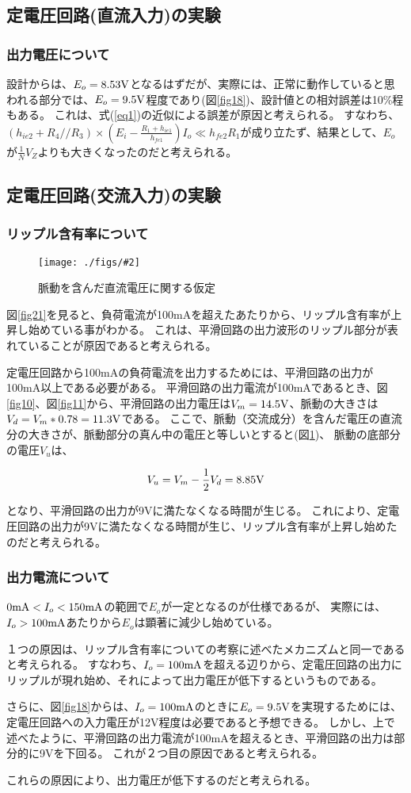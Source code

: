 \documentclass[11pt]{jsarticle}
\newcommand{\fg}[3]{ %
    \begin{figure}
        \begin{center}
            \texttt{[image: ./figs/\#2]}
            \caption{#3}
            \label{#1}
        \end{center}
    \end{figure}
}
\newcommand{\fr}[1]{図\ref{#1}}
\newcommand{\er}[1]{式(\ref{#1})}
\begin{document}
\subsection{定電圧回路(直流入力)の実験}
\subsubsection{出力電圧について}
設計からは、$E_o = 8.53{\rm V}$となるはずだが、実際には、正常に動作していると思われる部分では、$E_o = 9.5{\rm V}$程度であり(\fr{fig18})、設計値との相対誤差は10\%程もある。
これは、\er{eq1}の近似による誤差が原因と考えられる。
すなわち、$\left( h_{ie2} + R_4 // R_3 \right) \times \left( E_i - \frac{R_1 + h_{ie1}}{h_{fe1}} \right) I_o \ll h_{fe2}R_1$が成り立たず、結果として、$E_o$が$\frac{1}{N}V_Z$よりも大きくなったのだと考えられる。

\subsection{定電圧回路(交流入力)の実験}
\subsubsection{リップル含有率について}
\fg{fig27}{wave.png}{脈動を含んだ直流電圧に関する仮定}

\fr{fig21}を見ると、負荷電流が100mAを超えたあたりから、リップル含有率が上昇し始めている事がわかる。
これは、平滑回路の出力波形のリップル部分が表れていることが原因であると考えられる。

定電圧回路から100mAの負荷電流を出力するためには、平滑回路の出力が100mA以上である必要がある。
平滑回路の出力電流が100mAであるとき、\fr{fig10}、\fr{fig11}から、平滑回路の出力電圧は$V_m = 14.5{\rm V}$、脈動の大きさは$V_d = V_m * 0.78 = 11.3 {\rm V}$である。
ここで、脈動（交流成分）を含んだ電圧の直流分の大きさが、脈動部分の真ん中の電圧と等しいとすると(\fr{fig27})、
脈動の底部分の電圧$V_u$は、

\[
    V_u = V_m - \frac{1}{2} V_d = 8.85 {\rm V}
\]

となり、平滑回路の出力が9Vに満たなくなる時間が生じる。
これにより、定電圧回路の出力が9Vに満たなくなる時間が生じ、リップル含有率が上昇し始めたのだと考えられる。

\subsubsection{出力電流について}
$0{\rm mA} < I_o < 150 {\rm mA}$の範囲で$E_o$が一定となるのが仕様であるが、
実際には、$I_o > 100{\rm mA}$あたりから$E_o$は顕著に減少し始めている。

１つの原因は、リップル含有率についての考察に述べたメカニズムと同一であると考えられる。
すなわち、$I_o = 100{\rm mA}$を超える辺りから、定電圧回路の出力にリップルが現れ始め、それによって出力電圧が低下するというものである。

さらに、\fr{fig18}からは、$I_o = 100{\rm mA}$のときに$E_o = 9.5{\rm V}$を実現するためには、定電圧回路への入力電圧が12V程度は必要であると予想できる。
しかし、上で述べたように、平滑回路の出力電流が100mAを超えるとき、平滑回路の出力は部分的に9Vを下回る。
これが２つ目の原因であると考えられる。

これらの原因により、出力電圧が低下するのだと考えられる。
\end{document}
